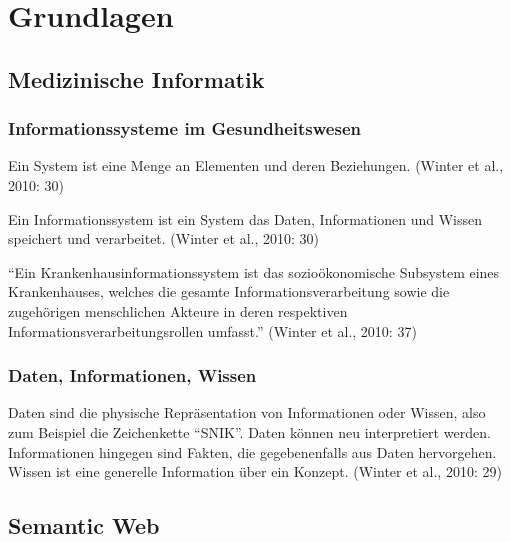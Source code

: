 \chapter{Grundlagen}\label{ch:preliminaries}

\section{Medizinische Informatik}

\subsection{Informationssysteme im Gesundheitswesen}

\begin{definition}[System]
Ein System ist eine Menge an Elementen und deren Beziehungen. (Winter et al., 2010: 30)
\end{definition}

\begin{definition}[Informationssystem]
Ein Informationssystem ist ein System das Daten, Informationen und Wissen speichert und verarbeitet. (Winter et al., 2010: 30)
\end{definition}

\begin{definition}
\enquote{Ein Krankenhausinformationssystem ist das sozioökonomische Subsystem eines Krankenhauses, welches die gesamte Informationsverarbeitung sowie die zugehörigen menschlichen Akteure in deren respektiven Informationsverarbeitungsrollen umfasst.} (Winter et al., 2010: 37)
\end{definition}

\subsection{Daten, Informationen, Wissen}
Daten sind die physische Repräsentation von Informationen oder Wissen, also zum Beispiel die Zeichenkette \enquote{SNIK}. Daten können neu interpretiert werden.
Informationen hingegen sind Fakten, die gegebenenfalls aus Daten hervorgehen.
Wissen ist eine generelle Information über ein Konzept. (Winter et al., 2010: 29)

\section{Semantic Web}

